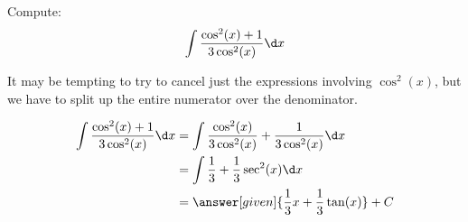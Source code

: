 \documentclass[nooutcomes]{ximera}
\begin{document}
\begin{example}
  Compute:
  \[
  \int \frac{\cos^2(x)+1}{3 \cos^2(x)}\d x
  \]
 
  \begin{explanation}
It may be tempting to try to cancel just the expressions involving $\cos^2(x)$, but we have to split up the entire numerator over the denominator.

    \begin{align*}
    \int \frac{\cos^2(x)+1}{3 \cos^2(x)}\d x &=  \int \frac{\cos^2(x)}{3 \cos^2(x)} +  \frac{1}{3 \cos^2(x)}\d x \\
    &= \int \frac{1}{3} + \frac{1}{3} \sec^2(x) \d x \\
    & = \answer[given]{\frac{1}{3}x+\frac{1}{3}\tan(x)}+C 
    \end{align*}
      
  \end{explanation}
\end{example}
\end{document}
